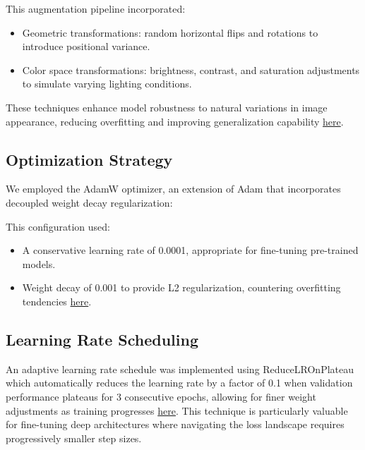\documentclass[a4paper,12pt]{article}
\begin{document}
This augmentation pipeline incorporated:
\begin{itemize}
    \item Geometric transformations: random horizontal flips and rotations to introduce positional variance.
    \item Color space transformations: brightness, contrast, and saturation adjustments to simulate varying lighting conditions.
\end{itemize}

These techniques enhance model robustness to natural variations in image appearance, reducing overfitting and improving generalization capability \href{https://arxiv.org/abs/1712.04621}{here}.

\subsection{Optimization Strategy}
We employed the AdamW optimizer, an extension of Adam that incorporates decoupled weight decay regularization:


This configuration used:
\begin{itemize}
    \item A conservative learning rate of 0.0001, appropriate for fine-tuning pre-trained models.
    \item Weight decay of 0.001 to provide L2 regularization, countering overfitting tendencies \href{https://openreview.net/forum?id=Bkg6RiCqY7}{here}.
\end{itemize}



\subsection{Learning Rate Scheduling}
An adaptive learning rate schedule was implemented using ReduceLROnPlateau which automatically reduces the learning rate by a factor of 0.1 when validation performance plateaus for 3 consecutive epochs, allowing for finer weight adjustments as training progresses \href{https://ieeexplore.ieee.org/document/7926641}{here}. This technique is particularly valuable for fine-tuning deep architectures where navigating the loss landscape requires progressively smaller step sizes.
\end{document}
